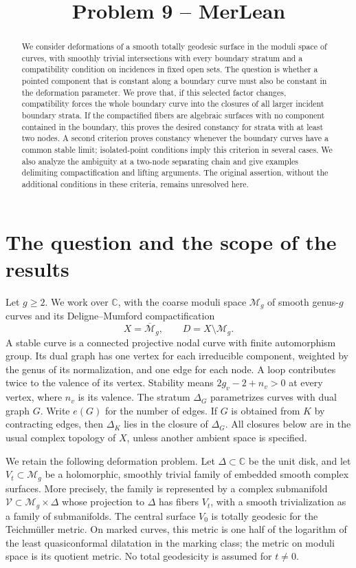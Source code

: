 \documentclass[11pt]{article}
\title{Problem 9 -- MerLean}
\author{}
\date{}
\newcommand{\M}{\mathcal M}
\newcommand{\Mb}{\overline{\mathcal M}}
\newcommand{\C}{\mathbb C}
\theoremstyle{definition}
\theoremstyle{remark}
\begin{document}
\maketitle

\begin{abstract}
We consider deformations of a smooth totally geodesic surface in the moduli space of curves, with smoothly trivial intersections with every boundary stratum and a compatibility condition on incidences in fixed open sets. The question is whether a pointed component that is constant along a boundary curve must also be constant in the deformation parameter. We prove that, if this selected factor changes, compatibility forces the whole boundary curve into the closures of all larger incident boundary strata. If the compactified fibers are algebraic surfaces with no component contained in the boundary, this proves the desired constancy for strata with at least two nodes. A second criterion proves constancy whenever the boundary curves have a common stable limit; isolated-point conditions imply this criterion in several cases. We also analyze the ambiguity at a two-node separating chain and give examples delimiting compactification and lifting arguments. The original assertion, without the additional conditions in these criteria, remains unresolved here.
\end{abstract}

\section{The question and the scope of the results}

Let $g\geq2$. We work over $\C$, with the coarse moduli space $\M_g$ of smooth genus-$g$ curves and its Deligne--Mumford compactification
\[
 X=\Mb_g,\qquad D=X\setminus\M_g.
\]
A stable curve is a connected projective nodal curve with finite automorphism group. Its dual graph has one vertex for each irreducible component, weighted by the genus of its normalization, and one edge for each node. A loop contributes twice to the valence of its vertex. Stability means $2g_v-2+n_v>0$ at every vertex, where $n_v$ is its valence. The stratum $\Delta_G$ parametrizes curves with dual graph $G$. Write $e(G)$ for the number of edges. If $G$ is obtained from $K$ by contracting edges, then $\Delta_K$ lies in the closure of $\Delta_G$. All closures below are in the usual complex topology of $X$, unless another ambient space is specified.

We retain the following deformation problem. Let $\Delta\subset\C$ be the unit disk, and let $V_t\subset\M_g$ be a holomorphic, smoothly trivial family of embedded smooth complex surfaces. More precisely, the family is represented by a complex submanifold $\mathcal V\subset\M_g\times\Delta$ whose projection to $\Delta$ has fibers $V_t$, with a smooth trivialization as a family of submanifolds. The central surface $V_0$ is totally geodesic for the Teichm\"uller metric. On marked curves, this metric is one half of the logarithm of the least quasiconformal dilatation in the marking class; the metric on moduli space is its quotient metric. No total geodesicity is assumed for $t\ne0$.
\end{document}
